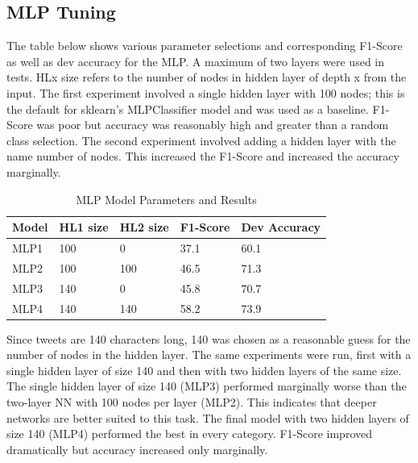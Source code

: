 \documentclass[11pt,a4paper]{article}
\begin{document}
\subsection{MLP Tuning}
The table below shows various parameter selections and corresponding F1-Score as well as dev accuracy for the MLP. A maximum of two layers were used in tests. HLx size refers to the number of nodes in hidden layer of depth x from the input. The first experiment involved a single hidden layer with 100 nodes; this is the default for sklearn’s MLPClassifier model and was used as a baseline. F1-Score was poor but accuracy was reasonably high and greater than a random class selection. The second experiment involved adding a hidden layer with the name number of nodes. This increased the F1-Score and increased the accuracy marginally.

\begin{table}[htp]
	\centering
	\caption{MLP Model Parameters and Results}
	\label{my-label}
	\hspace{-1.6cm}
	\begin{tabular}{@{}lllll@{}}
		\toprule
		Model       & HL1 size & HL2 size & F1-Score & Dev Accuracy \\ \midrule
		MLP1 		& 100     & 0  &     37.1 & 60.1  \\
		MLP2        & 100     & 100    &   46.5 & 71.3 \\
		MLP3     	& 140     & 0   &     45.8 & 70.7    \\
		MLP4        & 140     & 140    &   58.2 & 73.9  \\ \bottomrule

	\end{tabular}
\end{table} 
Since tweets are 140 characters long, 140 was chosen as a reasonable guess for the number of nodes in the hidden layer. The same experiments were run, first with a single hidden layer of size 140 and then with two hidden layers of the same size. The single hidden layer of size 140 (MLP3) performed marginally worse than the two-layer NN with 100 nodes per layer (MLP2). This indicates that deeper networks are better suited to this task. The final model with two hidden layers of size 140 (MLP4) performed the best in every category. F1-Score improved dramatically but accuracy increased only marginally.
\end{document}
